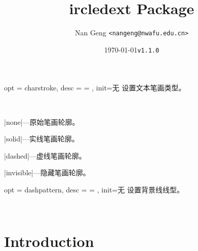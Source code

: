 \documentclass[full]{l3doc}
\def\vers{\texttt{v1.1.0} }
\begin{document}
\begin{documentation}
\bigskip

\begin{option}{ opt = charstroke, desc = {= }, init=无 }
  设置文本笔画类型。
\end{option}\\
\begin{Description}
  \item |none|---原始笔画轮廓。
  \item |solid|---实线笔画轮廓。
  \item |dashed|---虚线笔画轮廓。
  \item |invisible|---隐藏笔画轮廓。
\end{Description}
\begin{SideBySideExample}[frame=single,numbers=left,xrightmargin=.45\linewidth,gobble=2]
  \centering
  \quad
  \quad
  \quad
\end{SideBySideExample}

\bigskip

\begin{option}{ opt = dashpattern, desc = {= }, init=无 }
  设置背景线线型。
\end{option}\\
\begin{SideBySideExample}[frame=single,numbers=left,xrightmargin=.25\linewidth,gobble=2]
  \centering
  \quad
\end{SideBySideExample}

\title{
  ircledext Package 
}
\author{Nan Geng \texttt{<nangeng@nwafu.edu.cn>}}
\date{\today\qquad \vers}
\maketitle

\section{Introduction}


\end{documentation}
\end{document}
